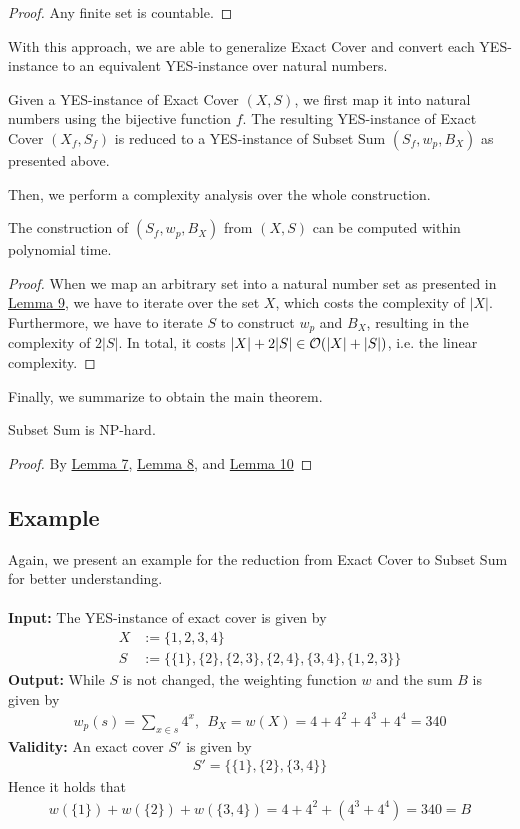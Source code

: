 \begin{proof}
    Any finite set is countable.
\end{proof}
With this approach, we are able to generalize Exact Cover and convert each YES-instance to an equivalent YES-instance 
over natural numbers. 
\begin{definition}
    \label{def:13}
    Given a YES-instance of Exact Cover $(X, S)$, 
    we first map it into natural numbers using the bijective function $f$. 
    The resulting YES-instance of Exact Cover $(X_f, S_f)$ is reduced to a YES-instance of Subset Sum $(S_f, w_p, B_X)$ as presented above.
\end{definition}
Then, we perform a complexity analysis over the whole construction.
\begin{lemma}
    The construction of $(S_f, w_p, B_X)$ from $(X, S)$ can be computed within polynomial time. 
    \label{lemma:10}
\end{lemma}
\begin{proof}
    When we map an arbitrary set into a natural number set as presented in \hyperref[lemma:9]{Lemma 9}, we have to iterate over the set $X$, which costs the complexity of $|X|$. 
Furthermore, we have to iterate $S$ to construct $w_p$ and $B_X$, resulting in the complexity of $2|S|$. In total, it costs $|X| + 2|S| \in\mathcal{O}({|X| + |S|})$, 
i.e. the linear complexity. 
\end{proof}
Finally, we summarize to obtain the main theorem.
\begin{theorem}
    Subset Sum is NP-hard.
\end{theorem}
\begin{proof}
    By \hyperref[lemma:7]{Lemma 7}, \hyperref[lemma:8]{Lemma 8}, and \hyperref[lemma:9]{Lemma 10}
\end{proof}

\subsection{Example}
Again, we present an example for the reduction from Exact Cover to Subset Sum for better understanding.\\\\
\textbf{Input:} The YES-instance of exact cover is given by 
\begin{align*}
    X &:= \{1, 2, 3, 4\} \\ 
    S &:= \{\{1\}, \{2\}, \{2, 3\}, 
    \{2, 4\}, \{3, 4\}, \{1, 2, 3\}\}
\end{align*}
\textbf{Output:} 
While $S$ is not changed, the weighting function $w$ and the sum $B$ is given by 
\begin{align*}
    w_p(s) = \sum_{x \in s} 4^x, \ \
    B_X = w(X) = 4 + 4^2 + 4^3 + 4^4 = 340
\end{align*}
\textbf{Validity:} An exact cover $S'$ is given by 
\begin{align*}
    S' = \{\{1\}, \{2\}, \{3, 4\}\}
\end{align*}
Hence it holds that 
\begin{align*}
    w(\{1\}) + w(\{2\}) + w(\{3,4\}) = 4 + 4^2 + (4^3 + 4^4) = 340 = B
\end{align*}


